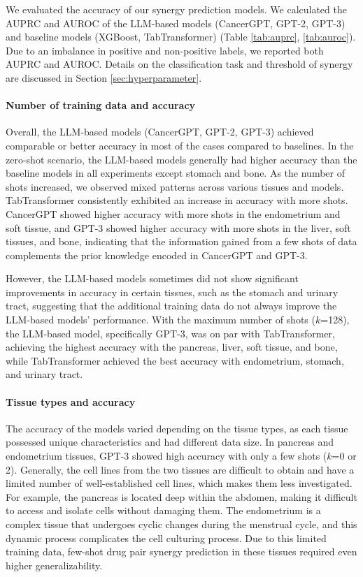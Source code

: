 We evaluated the accuracy of our synergy prediction models. We calculated the AUPRC and AUROC of the LLM-based models (CancerGPT, GPT-2, GPT-3) and baseline models (XGBoost, TabTransformer) (Table \ref{tab:auprc}, \ref{tab:auroc}). Due to an imbalance in positive and non-positive labels, we reported both AUPRC and AUROC. Details on the classification task and threshold of synergy are discussed in Section \ref{sec:hyperparameter}. 

\paragraph{Number of training data and accuracy}

Overall, the LLM-based models (CancerGPT, GPT-2, GPT-3) achieved comparable or better accuracy in most of the cases compared to baselines. In the zero-shot scenario, the LLM-based models generally had higher accuracy than the baseline models in all experiments except stomach and bone. As the number of shots increased, we observed mixed patterns across various tissues and models. TabTransformer consistently exhibited an increase in accuracy with more shots. CancerGPT showed higher accuracy with more shots in the endometrium and soft tissue, and GPT-3 showed higher accuracy with more shots in the liver, soft tissues, and bone, indicating that the information gained from a few shots of data complements the prior knowledge encoded in CancerGPT and GPT-3. 

However, the LLM-based models sometimes did not show significant improvements in accuracy in certain tissues, such as the stomach and urinary tract, suggesting that the additional training data do not always improve the LLM-based models' performance. 
With the maximum number of shots ($k$=128), the LLM-based model, specifically GPT-3, was on par with TabTransformer, achieving the highest accuracy with the pancreas, liver, soft tissue, and bone, while TabTransformer achieved the best accuracy with endometrium, stomach, and urinary tract.

\paragraph{Tissue types and accuracy}
The accuracy of the models varied depending on the tissue types, as each tissue possessed unique characteristics and had different data size. In pancreas and endometrium tissues, GPT-3 showed high accuracy with only a few shots ($k$=0 or 2). Generally, the cell lines from the two tissues are difficult to obtain and have a limited number of well-established cell lines, which makes them less investigated. For example, the pancreas is located deep within the abdomen, making it difficult to access and isolate cells without damaging them. The endometrium is a complex tissue that undergoes cyclic changes during the menstrual cycle, and this dynamic process complicates the cell culturing process. Due to this limited training data, few-shot drug pair synergy prediction in these tissues required even higher generalizability.

